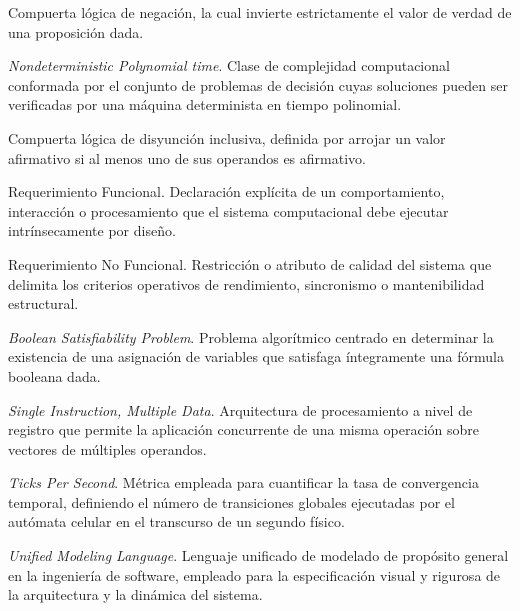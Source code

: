 \begin{description}[NAND]
\item[NOT]{Compuerta lógica de negación, la cual invierte estrictamente el valor de verdad de una proposición dada.}
\item[NP]{\textit{Nondeterministic Polynomial time}. Clase de complejidad computacional conformada por el conjunto de problemas de decisión cuyas soluciones pueden ser verificadas por una máquina determinista en tiempo polinomial.}
\item[OR]{Compuerta lógica de disyunción inclusiva, definida por arrojar un valor afirmativo si al menos uno de sus operandos es afirmativo.}
\item[RF]{Requerimiento Funcional. Declaración explícita de un comportamiento, interacción o procesamiento que el sistema computacional debe ejecutar intrínsecamente por diseño.}
\item[RNF]{Requerimiento No Funcional. Restricción o atributo de calidad del sistema que delimita los criterios operativos de rendimiento, sincronismo o mantenibilidad estructural.}
\item[SAT]{\textit{Boolean Satisfiability Problem}. Problema algorítmico centrado en determinar la existencia de una asignación de variables que satisfaga íntegramente una fórmula booleana dada.}
\item[SIMD]{\textit{Single Instruction, Multiple Data}. Arquitectura de procesamiento a nivel de registro que permite la aplicación concurrente de una misma operación sobre vectores de múltiples operandos.}
\item[TPS]{\textit{Ticks Per Second}. Métrica empleada para cuantificar la tasa de convergencia temporal, definiendo el número de transiciones globales ejecutadas por el autómata celular en el transcurso de un segundo físico.}
\item[UML]{\textit{Unified Modeling Language}. Lenguaje unificado de modelado de propósito general en la ingeniería de software, empleado para la especificación visual y rigurosa de la arquitectura y la dinámica del sistema.}
\end{description}